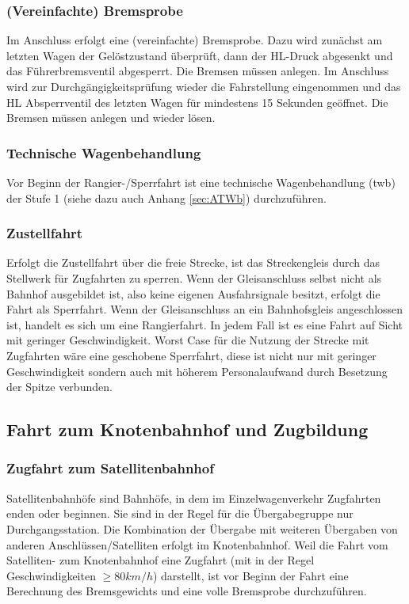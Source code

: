 \subsubsection{(Vereinfachte) Bremsprobe}\label{sec:vBremsprobe}
Im Anschluss erfolgt eine (vereinfachte) \gls{Bremsprobe}. Dazu wird zunächst am letzten Wagen der Gelöstzustand überprüft, dann der \acrshort{HL}-Druck abgesenkt und das Führerbremsventil abgesperrt. Die Bremsen müssen anlegen. Im Anschluss wird zur Durchgängigkeitsprüfung wieder die Fahrstellung eingenommen und das \acrshort{HL} Absperrventil des letzten Wagen für mindestens 15 Sekunden geöffnet. Die Bremsen müssen anlegen und wieder lösen.
\subsubsection{Technische Wagenbehandlung}\label{sec:tWb}
Vor Beginn der Rangier-/\gls{Sperrfahrt} ist eine technische Wagenbehandlung (\acrshort{twb}) der Stufe 1 (siehe dazu auch Anhang \ref{sec:ATWb}) durchzuführen. 
\subsubsection{Zustellfahrt}\label{sec:Zustellfahrt}
Erfolgt die Zustellfahrt über die freie Strecke, ist das Streckengleis durch das Stellwerk für \gls{Zugfahrt}en zu sperren. Wenn der Gleisanschluss selbst nicht als Bahnhof ausgebildet ist, also keine eigenen Ausfahrsignale besitzt, erfolgt die Fahrt als \gls{Sperrfahrt}. Wenn der \gls{Gleisanschluss} an ein Bahnhofsgleis angeschlossen ist, handelt es sich um eine \gls{Rangierfahrt}. In jedem Fall ist es eine Fahrt auf Sicht mit geringer Geschwindigkeit. Worst Case für die Nutzung der Strecke mit \gls{Zugfahrt}en wäre eine geschobene \gls{Sperrfahrt}, diese ist nicht nur mit geringer Geschwindigkeit sondern auch mit höherem Personalaufwand durch Besetzung der Spitze verbunden.

\subsection{Fahrt zum Knotenbahnhof und Zugbildung}
\subsubsection{Zugfahrt zum Satellitenbahnhof}\label{sec:Zugfahrt}
Satellitenbahnhöfe sind Bahnhöfe, in dem im Einzelwagenverkehr \gls{Zugfahrt}en enden oder beginnen. Sie sind in der Regel für die Übergabegruppe nur Durchgangsstation. Die Kombination der Übergabe mit weiteren Übergaben von anderen Anschlüssen/Satelliten erfolgt im \gls{Knotenbahnhof}. Weil die Fahrt vom Satelliten- zum \gls{Knotenbahnhof} eine \gls{Zugfahrt} (mit in der Regel Geschwindigkeiten $\ge 80 km/h$) darstellt, ist vor Beginn der Fahrt eine Berechnung des Bremsgewichts und eine volle \gls{Bremsprobe} durchzuführen.%
